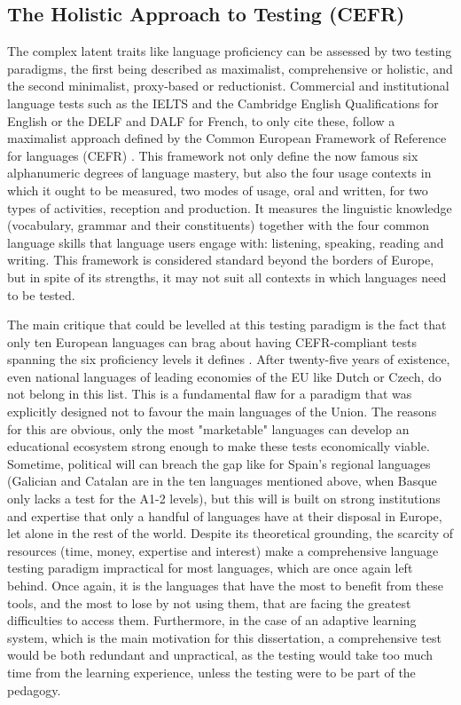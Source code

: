     \subsection{The Holistic Approach to Testing (CEFR)}
The complex latent traits like language proficiency can be assessed by two testing paradigms, the first being described as maximalist, comprehensive or holistic, and the second minimalist, proxy-based or reductionist. Commercial and institutional language tests such as the IELTS and the Cambridge English Qualifications for English or the DELF and DALF for French, to only cite these, follow a maximalist approach defined by the Common European Framework of Reference for languages (CEFR) \parencite{europe_common_2020}. This framework not only define the now famous six alphanumeric degrees of language mastery, but also the four usage contexts in which it ought to be measured, two modes of usage, oral and written, for two types of activities, reception and production. It measures the linguistic knowledge (vocabulary, grammar and their constituents) together with the four common language skills that language users engage with: listening, speaking, reading and writing. This framework is considered standard beyond the borders of Europe, but in spite of its strengths, it may not suit all contexts in which languages need to be tested.

The main critique that could be levelled at this testing paradigm is the fact that only ten European languages can brag about having CEFR-compliant tests spanning the six proficiency levels it defines \parencite{noauthor_common_2025, noauthor_cadre_2025}. After twenty-five years of existence, even national languages of leading economies of the EU like Dutch or Czech, do not belong in this list. This is a fundamental flaw for a paradigm that was explicitly designed not to favour the main languages of the Union. The reasons for this are obvious, only the most "marketable" languages can develop an educational ecosystem strong enough to make these tests economically viable. Sometime, political will can breach the gap like for Spain's regional languages (Galician and Catalan are in the ten languages mentioned above, when Basque only lacks a test for the A1-2 levels), but this will is built on strong institutions and expertise that only a handful of languages have at their disposal in Europe, let alone in the rest of the world. Despite its theoretical grounding, the scarcity of resources (time, money, expertise and interest) make a comprehensive language testing paradigm impractical for most languages, which are once again left behind. Once again, it is the languages that have the most to benefit from these tools, and the most to lose by not using them, that are facing the greatest difficulties to access them. Furthermore, in the case of an adaptive learning system, which is the main motivation for this dissertation, a comprehensive test would be both redundant and unpractical, as the testing would take too much time from the learning experience, unless the testing were to be part of the pedagogy.

